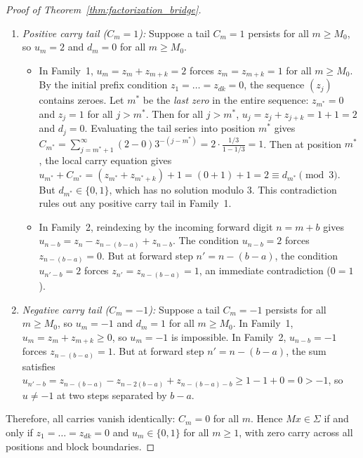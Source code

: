 \documentclass[11pt,reqno]{amsart}
\theoremstyle{plain}
\theoremstyle{definition}
\theoremstyle{remark}
\begin{document}
\begin{proof}[Proof of Theorem~\ref{thm:factorization_bridge}]
\begin{enumerate}
    \begin{itemize}
        \item If $C_{m-1} = 1$, the carry equation requires $u_m + C_m = d_m + 3$. Since $u_m \le 2$ (Condition~(S)) and $C_m \le 1$, the left-hand side is at most $3$. Since $d_m \in \{0, 1\}$, the right-hand side is at least $3$. Equality requires $u_m = 2$, $C_m = 1$, and $d_m = 0$. By forward induction, $C_{m-1} = 1$ forces an infinite persistent tail $C_j = 1$, $u_j = 2$, and $d_j = 0$ for all $j \ge m-1$.
        \item If $C_{m-1} = -1$, the carry equation requires $u_m + C_m = d_m - 3 \in \{-3, -2\}$. Since $u_m \ge -1$ and $C_m \ge -1$, $u_m + C_m \ge -2$. Equality requires $u_m = -1$, $C_m = -1$, and $d_m = 1$. By forward induction, $C_{m-1} = -1$ forces an infinite persistent tail $C_j = -1$, $u_j = -1$, and $d_j = 1$ for all $j \ge m-1$.
    \end{itemize}
    \item \emph{Positive carry tail ($C_m = 1$):} Suppose a tail $C_m = 1$ persists for all $m \ge M_0$, so $u_m = 2$ and $d_m = 0$ for all $m \ge M_0$.
    \begin{itemize}
        \item In Family~1, $u_m = z_m + z_{m+k} = 2$ forces $z_m = z_{m+k} = 1$ for all $m \ge M_0$. By the initial prefix condition $z_1 = \dots = z_{dk} = 0$, the sequence $(z_j)$ contains zeroes. Let $m^*$ be the \emph{last zero} in the entire sequence: $z_{m^*} = 0$ and $z_j = 1$ for all $j > m^*$. Then for all $j > m^*$, $u_j = z_j + z_{j+k} = 1 + 1 = 2$ and $d_j = 0$. Evaluating the tail series into position $m^*$ gives $C_{m^*} = \sum_{j=m^*+1}^\infty (2 - 0) 3^{-(j-m^*)} = 2 \cdot \frac{1/3}{1-1/3} = 1$. Then at position $m^*$, the local carry equation gives $u_{m^*} + C_{m^*} = (z_{m^*} + z_{m^*+k}) + 1 = (0 + 1) + 1 = 2 \equiv d_{m^*} \pmod 3$. But $d_{m^*} \in \{0, 1\}$, which has no solution modulo $3$. This contradiction rules out any positive carry tail in Family~1.
        \item In Family~2, reindexing by the incoming forward digit $n = m+b$ gives $u_{n-b} = z_n - z_{n-(b-a)} + z_{n-b}$. The condition $u_{n-b} = 2$ forces $z_{n-(b-a)} = 0$. But at forward step $n' = n - (b-a)$, the condition $u_{n'-b} = 2$ forces $z_{n'} = z_{n-(b-a)} = 1$, an immediate contradiction ($0 = 1$).
    \end{itemize}
    \item \emph{Negative carry tail ($C_m = -1$):} Suppose a tail $C_m = -1$ persists for all $m \ge M_0$, so $u_m = -1$ and $d_m = 1$ for all $m \ge M_0$. In Family~1, $u_m = z_m + z_{m+k} \ge 0$, so $u_m = -1$ is impossible. In Family~2, $u_{n-b} = -1$ forces $z_{n-(b-a)} = 1$. But at forward step $n' = n - (b-a)$, the sum satisfies $u_{n'-b} = z_{n-(b-a)} - z_{n-2(b-a)} + z_{n-(b-a)-b} \ge 1 - 1 + 0 = 0 > -1$, so $u \ne -1$ at two steps separated by $b-a$.
\end{enumerate}
Therefore, all carries vanish identically: $C_m = 0$ for all $m$. Hence $M x \in \Sigma$ if and only if $z_1 = \dots = z_{dk} = 0$ and $u_m \in \{0, 1\}$ for all $m \ge 1$, with zero carry across all positions and block boundaries.


\end{proof}
\end{document}
